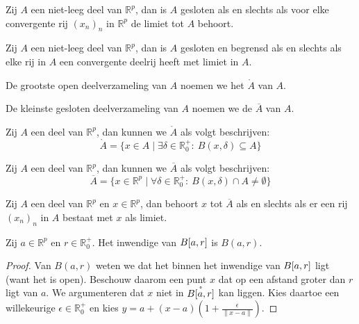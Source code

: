 \documentclass[main.tex]{subfiles}
\begin{document}
\begin{pr}
  Zij $A$ een niet-leeg deel van $\mathbb{R}^{p}$, dan is $A$ gesloten als en slechts als voor elke convergente rij $(x_{n})_{n}$ in $\mathbb{R}^{p}$ de limiet tot $A$ behoort.
\end{pr}

\begin{st}
  \label{st:in-rp-gesloten-en-begrensd-itv-rijen}
  Zij $A$ een niet-leeg deel van $\mathbb{R}^{p}$, dan is $A$ gesloten en begrensd als en slechts als elke rij in $A$ een convergente deelrij heeft met limiet in $A$.
\end{st}

\begin{de}
  \label{de:inwendige}
  De grootste open deelverzameling van $A$ noemen we het  $\mathring{A}$ van $A$.
\end{de}

\begin{de}
  De kleinste gesloten deelverzameling van $A$ noemen we de  $\overline{A}$ van $A$.
\end{de}

\begin{pr}
  \label{pr:rp-puntsgewijze-karakterisatie-inwendige}
  Zij $A$ een deel van $\mathbb{R}^{p}$, dan kunnen we $\mathring{A}$ als volgt beschrijven:
  \[ \mathring{A} = \{ x \in A \mid \exists \delta \in \mathbb{R}_{0}^{+}:\ B(x,\delta) \subseteq A \} \]
\end{pr}

\begin{pr}
  \label{pr:rp-puntsgewijze-karakterisatie-sluiting}
  Zij $A$ een deel van $\mathbb{R}^{p}$, dan kunnen we $\overline{A}$ als volgt beschrijven:
  \[ \overline{A} = \{ x \in \mathbb{R}^{p} \mid \forall \delta \in \mathbb{R}_{0}^{+}:\ B(x,\delta) \cap A \neq \emptyset \} \]
\end{pr}

\begin{pr}
  \label{pr:rp-karakterisatie-sluiting-itv-rijen}
  Zij $A$ een deel van $\mathbb{R}^{p}$ en $x\in \mathbb{R}^{p}$, dan behoort $x$ tot $\overline{A}$ als en slechts als er een rij $(x_{n})_{n}$ in $A$ bestaat met $x$ als limiet.
\end{pr}

\begin{st}
  Zij $a\in \mathbb{R}^{p}$ en $r\in \mathbb{R}_{0}^{+}$.
  Het inwendige van $B\interval{a}{r}$ is $B(a,r)$.

  \begin{proof}
    Van $B(a,r)$ weten we dat het binnen het inwendige van $B\interval{a}{r}$ ligt (want het is open).\label{de:rp-inwendige}
    Beschouw daarom een punt $x$ dat op een afstand groter dan $r$ ligt van $a$.
    We argumenteren dat $x$ niet in $\mathring{B\interval{a}{r}}$ kan liggen.
    Kies daartoe een willekeurige $\epsilon \in \mathbb{R}_{0}^{+}$ en kies $y=a + (x-a)\left(1+\frac{\epsilon}{\|x-a\|}\right)$.
  \end{proof}
\end{st}
\end{document}
